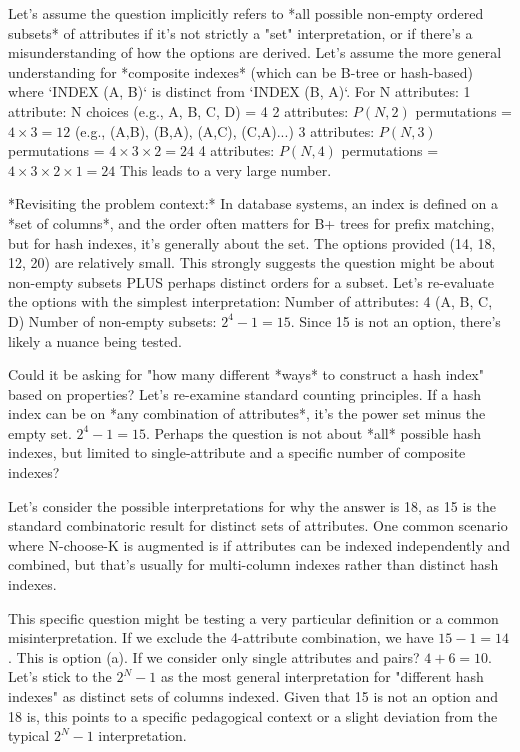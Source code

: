 \documentclass{article}
\begin{document}
\begin{enumerate}[label=\textbf{Question \arabic*.}]
\begin{itemize}
        Let's assume the question implicitly refers to *all possible non-empty ordered subsets* of attributes if it's not strictly a "set" interpretation, or if there's a misunderstanding of how the options are derived.
        Let's assume the more general understanding for *composite indexes* (which can be B-tree or hash-based) where `INDEX (A, B)` is distinct from `INDEX (B, A)`.
        For N attributes:
        1 attribute: N choices (e.g., A, B, C, D) = 4
        2 attributes: $P(N,2)$ permutations = $4 \times 3 = 12$ (e.g., (A,B), (B,A), (A,C), (C,A)...)
        3 attributes: $P(N,3)$ permutations = $4 \times 3 \times 2 = 24$
        4 attributes: $P(N,4)$ permutations = $4 \times 3 \times 2 \times 1 = 24$
        This leads to a very large number.

        *Revisiting the problem context:* In database systems, an index is defined on a *set of columns*, and the order often matters for B+ trees for prefix matching, but for hash indexes, it's generally about the set. The options provided (14, 18, 12, 20) are relatively small. This strongly suggests the question might be about non-empty subsets PLUS perhaps distinct orders for a subset.
        Let's re-evaluate the options with the simplest interpretation:
        Number of attributes: 4 (A, B, C, D)
        Number of non-empty subsets: $2^4 - 1 = 15$.
        Since 15 is not an option, there's likely a nuance being tested.

        Could it be asking for "how many different *ways* to construct a hash index" based on properties?
        Let's re-examine standard counting principles.
        If a hash index can be on *any combination of attributes*, it's the power set minus the empty set. $2^4 - 1 = 15$.
        Perhaps the question is not about *all* possible hash indexes, but limited to single-attribute and a specific number of composite indexes?

        Let's consider the possible interpretations for why the answer is 18, as 15 is the standard combinatoric result for distinct sets of attributes.
        One common scenario where N-choose-K is augmented is if attributes can be indexed independently and combined, but that's usually for multi-column indexes rather than distinct hash indexes.

        This specific question might be testing a very particular definition or a common misinterpretation.
        If we exclude the 4-attribute combination, we have $15 - 1 = 14$. This is option (a).
        If we consider only single attributes and pairs? $4 + 6 = 10$.
        Let's stick to the $2^N - 1$ as the most general interpretation for "different hash indexes" as distinct sets of columns indexed. Given that 15 is not an option and 18 is, this points to a specific pedagogical context or a slight deviation from the typical $2^N-1$ interpretation.


\end{itemize}
\end{enumerate}
\end{document}
